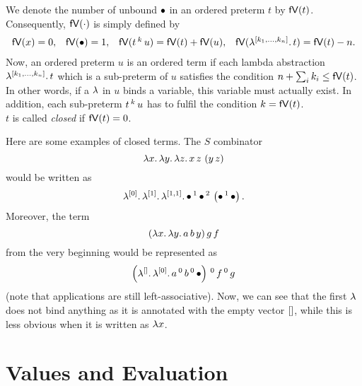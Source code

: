 \documentclass[submission,copyright,creativecommons]{eptcs}
\begin{document}
We denote the number of unbound $\mathord{\bullet}$ in an ordered preterm $t$ by $\mathsf{fV}(t)$. Consequently, $\mathsf{fV}(\cdot)$ is simply defined by 
\[
\begin{array}{cccc}
\mathsf{fV}(x) = 0, & \mathsf{fV}(\mathord{\bullet}) = 1, & \mathsf{fV}(t \, ^{k} \, u) = \mathsf{fV}(t) + \mathsf{fV}(u), & \mathsf{fV}(\lambda ^{[k_1, \ldots, k_n]} . \, t) = \mathsf{fV}(t) - n.
\end{array}
\]
Now, an ordered preterm $u$ is an ordered term if each lambda abstraction $\lambda ^{[k_1, \ldots, k_n]} . \, t$ which is a sub-preterm of $u$ satisfies the condition $n + \sum_i k_i \leq \mathsf{fV}(t)$. In other words, if a $\lambda$ in $u$ binds a variable, this variable must actually exist. In addition, each sub-preterm $t \, ^{k} \, u$ has to fulfil the condition $k = \mathsf{fV}(t)$.\\
$t$ is called \emph{closed} if $\mathsf{fV}(t) = 0$.

Here are some examples of closed terms.
The $S$ combinator 
\[
\lambda {x}. \, \lambda {y}. \, \lambda {z}. \, x \, z \, \left( y \, z \right)
\]
would be written as 
\[\lambda ^{[0]} . \, \lambda ^{[1]} . \, \lambda ^{[1,1]} . \, \mathord{\bullet} \, ^{1} \, \mathord{\bullet} \, ^{2} \, \left( \mathord{\bullet} \, ^{1} \, \mathord{\bullet} \right).
\]
Moreover, the term 
\[
(\lambda {x}. \, \lambda {y}. \, a \, b \, y) \, g \, f
\]
from the very beginning would be represented as
\[
\left(\lambda ^{[]} . \, \lambda ^{[0]} . \, a \, ^{0} \, b \, ^{0} \, \mathord{\bullet}\right) \, ^{0} \, f  \, ^{0} \, g
\]
(note that applications are still left-associative). Now, we can see that the first $\lambda$ does not bind anything as it is annotated with the empty vector $[]$, while this is less obvious when it is written as $\lambda x$.


\section{Values and Evaluation} \label{eval}
\end{document}
